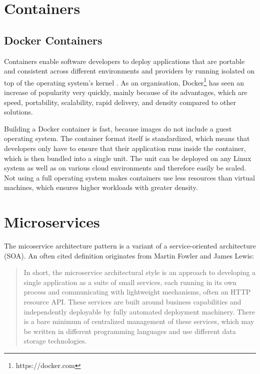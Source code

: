 \section{Containers}\label{containers}

\subsection{Docker Containers}\label{docker-containers}

Containers enable software developers to deploy applications that are
portable and consistent across different environments and providers
\cite{baier-kub} by running isolated on top of the operating system's
kernel \cite{bashari}. As an organisation, Docker\footnote{https://docker.com}
has seen an increase of popularity very quickly, mainly because of its
advantages, which are speed, portability, scalability, rapid delivery,
and density \cite{bashari} compared to other solutions.

Building a Docker container is fast, because images do not include a
guest operating system. The container format itself is standardized,
which means that developers only have to ensure that their application
runs inside the container, which is then bundled into a single unit. The
unit can be deployed on any Linux system as well as on various cloud
environments and therefore easily be scaled. Not using a full operating
system makes containers use less resources than virtual machines, which
ensures higher workloads with greater density. \cite{joy2015}

\section{Microservices}\label{microservices}

The micoservice architecture pattern is a variant of a service-oriented
architecture (SOA). An often cited definition originates from Martin
Fowler and James Lewis:

\begin{quote}
In short, the microservice architectural style is an approach to
developing a single application as a suite of small services, each
running in its own process and communicating with lightweight
mechanisms, often an HTTP resource API. These services are built around
business capabilities and independently deployable by fully automated
deployment machinery. There is a bare minimum of centralized management
of these services, which may be written in different programming
languages and use different data storage technologies.
\cite{lewis2014microservices}
\end{quote}

